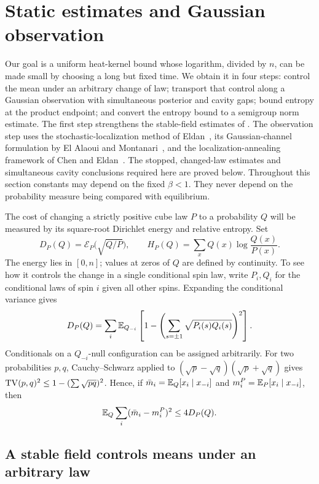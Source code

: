 \section{Static estimates and Gaussian observation}\label{sec:static}
\providecommand{\sech}{\operatorname{sech}}

Our goal is a uniform heat-kernel bound whose logarithm, divided by $n$,
can be made small by choosing a long but fixed time.  We obtain it in four
steps: control the mean under an arbitrary change of law; transport that
control along a Gaussian observation with simultaneous posterior and cavity
gaps; bound entropy at the product endpoint; and convert the entropy bound
to a semigroup norm estimate.  The first step strengthens the stable-field
estimates of \cite{SKGap}.  The observation step uses
the stochastic-localization method of Eldan~\cite{Eldan2013}, its
Gaussian-channel formulation by El Alaoui and Montanari~\cite{ElAlaouiMontanari2021},
and the localization-annealing framework of Chen and Eldan~\cite{CE2025}.
The stopped, changed-law estimates and simultaneous cavity conclusions
required here are proved below. Throughout
this section constants may depend on the fixed $\beta<1$.  They never depend
on the probability measure being compared with equilibrium.

The cost of changing a strictly positive cube law $P$ to a probability
$Q$ will be measured by its square-root Dirichlet energy and relative
entropy.  Set
\[
 D_P(Q)=\mathcal E_P\bigl(\sqrt{Q/P}\bigr),\qquad
 H_P(Q)=\sum_x Q(x)\log\frac{Q(x)}{P(x)}.
\]
The energy lies in $[0,n]$; values at zeros of $Q$ are defined by
continuity.  To see how it controls the change in a single conditional
spin law, write $P_i,Q_i$ for the conditional laws of spin $i$ given
all other spins.  Expanding the conditional variance gives
\begin{equation}\label{eq:stat-affinity}
 D_P(Q)=\sum_i\mathbb E_{Q_{-i}}\left[
 1-\left(\sum_{s=\pm1}\sqrt{P_i(s)Q_i(s)}\right)^2\right].
\end{equation}
Conditionals on a $Q_{-i}$-null configuration can be assigned arbitrarily.
For two probabilities $p,q$, Cauchy--Schwarz applied to
$(\sqrt p-\sqrt q)(\sqrt p+\sqrt q)$ gives
$\operatorname{TV}(p,q)^2\le1-(\sum\sqrt{pq})^2$.  Hence, if
$\bar m_i=\mathbb E_Q[x_i\mid x_{-i}]$ and
$m_i^P=\mathbb E_P[x_i\mid x_{-i}]$, then
\begin{equation}\label{eq:stat-conditional-means}
 \mathbb E_Q\sum_i(\bar m_i-m_i^P)^2\le4D_P(Q).
\end{equation}

\subsection{A stable field controls means under an arbitrary law}

